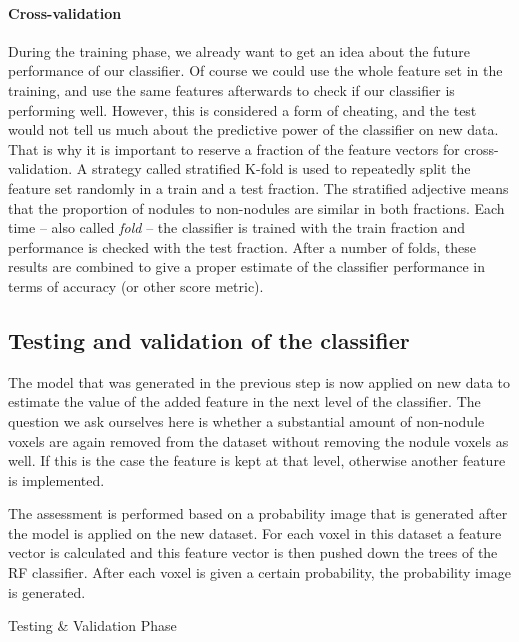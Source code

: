 \paragraph{Cross-validation}
During the training phase, we already want to get an idea about the future
performance of our classifier. Of course we could use the whole feature set in
the training, and use the same features afterwards to check if our classifier is
performing well. However, this is considered a form of cheating, and the test
would not tell us much about the predictive power of the classifier on new data.
That is why it is important to reserve a fraction of the feature vectors for
cross-validation. A strategy called stratified K-fold is used to repeatedly
split the feature set randomly in a train and a test fraction.
The stratified adjective means that the proportion of nodules to non-nodules are
similar in both fractions. Each time -- also called \textit{fold} -- the
classifier is trained with the train fraction and performance is checked with
the test fraction. After a number of folds, these results are combined to give a
proper estimate of the classifier performance in terms of accuracy (or other
score metric).

\subsection{Testing and validation of the classifier}
The model that was generated in the previous step is now applied on new data
to estimate the value of the added feature in the next level of the
classifier.
The question we ask ourselves here is whether a substantial amount of
non-nodule voxels are again removed from the dataset without removing the nodule
voxels as well. If this is the case the feature is kept at that level, otherwise
another feature is implemented.

The assessment is performed based on a probability image that is generated after
the model is applied on the new dataset. For each voxel in this dataset a
feature vector is calculated and this feature vector is then pushed down the
trees of the RF classifier. After each voxel is given a certain probability, the
probability image is generated.

\begin{algorithm}[H]
	\DontPrintSemicolon
	\caption{Testing \& Validation Phase\label{alg:test}}
\end{algorithm}

